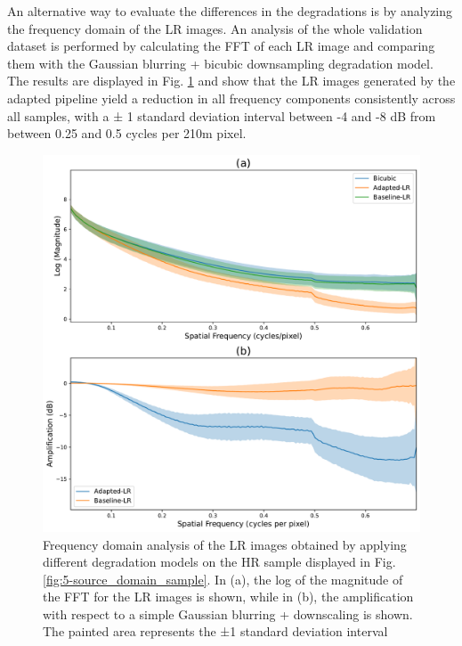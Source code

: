         An alternative way to evaluate the differences in the degradations is by analyzing the frequency domain of the LR images.
        An analysis of the whole validation dataset is performed by calculating the FFT of each LR image and comparing them with the Gaussian blurring + bicubic downsampling degradation model.
        The results are displayed in Fig. \ref{fig:5-lr-images-fft-comparison} and show that the LR images generated by the adapted pipeline yield a reduction in all frequency components consistently across all samples, with a ± 1 standard deviation interval between -4 and -8 dB from between 0.25 and 0.5 cycles per 210m pixel.

        \begin{figure}[H]
            \centering
            \includegraphics[scale=0.5]{Includes/5-source-lr-amplification-statistics.pdf}
            \caption{Frequency domain analysis of the LR images obtained by applying different degradation models on the HR sample displayed in Fig. \ref{fig:5-source_domain_sample}.
                     In (a), the log of the magnitude of the FFT for the LR images is shown,
                     while in (b), the amplification with respect to a  simple Gaussian blurring + downscaling is shown.
                     The painted area represents the ±1 standard deviation interval}
            \label{fig:5-lr-images-fft-comparison}
        \end{figure}




